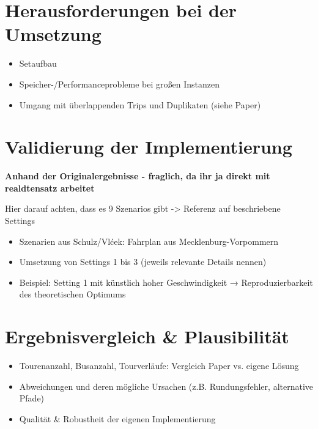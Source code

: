\section{Herausforderungen bei der Umsetzung}
\begin{itemize}
    \item Setaufbau
    \item Speicher-/Performanceprobleme bei großen Instanzen
    \item Umgang mit überlappenden Trips und Duplikaten (siehe Paper)
\end{itemize}

\section{Validierung der Implementierung} 

\textbf{Anhand der Originalergebnisse  - fraglich, da ihr ja direkt mit realdtensatz arbeitet}

Hier darauf achten, dass es 9 Szenarios gibt -> Referenz auf beschriebene Settings

\begin{itemize}
    \item Szenarien aus Schulz/Vlćek: Fahrplan aus Mecklenburg-Vorpommern
    \item Umsetzung von Settings 1 bis 3 (jeweils relevante Details nennen)
    \item Beispiel: Setting 1 mit künstlich hoher Geschwindigkeit → Reproduzierbarkeit des theoretischen Optimums
\end{itemize}
\section{Ergebnisvergleich \& Plausibilität}
\begin{itemize}
\item Tourenanzahl, Busanzahl, Tourverläufe: Vergleich Paper vs. eigene Lösung
\item Abweichungen und deren mögliche Ursachen (z.B. Rundungsfehler, alternative Pfade)
\item Qualität \& Robustheit der eigenen Implementierung
\end{itemize}


